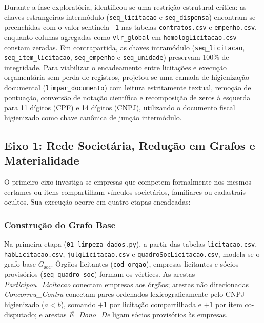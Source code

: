Durante a fase exploratória, identificou-se uma restrição estrutural crítica: as chaves estrangeiras intermódulo (\texttt{seq\_\allowbreak licitacao} e \texttt{seq\_\allowbreak dispensa}) encontram-se preenchidas com o valor sentinela \texttt{-1} nas tabelas \texttt{contratos.csv} e \texttt{empenho.csv}, enquanto colunas agregadas como \texttt{vlr\_\allowbreak global} em \texttt{homolog\allowbreak Licitacao\allowbreak .csv} constam zeradas. Em contrapartida, as chaves intramódulo (\texttt{seq\_\allowbreak licitacao}, \texttt{seq\_\allowbreak item\_\allowbreak licitacao}, \texttt{seq\_\allowbreak empenho} e \texttt{seq\_\allowbreak unidade}) preservam 100\% de integridade. Para viabilizar o encadeamento entre licitações e execução orçamentária sem perda de registros, projetou-se uma camada de higienização documental (\texttt{limpar\_\allowbreak documento}) com leitura estritamente textual, remoção de pontuação, conversão de notação científica e recomposição de zeros à esquerda para 11 dígitos (CPF) e 14 dígitos (CNPJ), utilizando o documento fiscal higienizado como chave canônica de junção intermódulo.

\subsection{Eixo 1: Rede Societária, Redução em Grafos e Materialidade}

O primeiro eixo investiga se empresas que competem formalmente nos mesmos certames ou itens compartilham vínculos societários, familiares ou cadastrais ocultos. Sua execução ocorre em quatro etapas encadeadas:

\subsubsection{Construção do Grafo Base}
Na primeira etapa (\texttt{01\_\allowbreak limpeza\_\allowbreak dados\allowbreak .py}), a partir das tabelas \texttt{licitacao\allowbreak .csv}, \texttt{hab\allowbreak Licitacao\allowbreak .csv}, \texttt{julg\allowbreak Licitacao\allowbreak .csv} e \texttt{quadro\allowbreak Soc\allowbreak Licitacao\allowbreak .csv}, modela-se o grafo base $G_{\text{soc}}$. Órgãos licitantes (\texttt{cod\_\allowbreak orgao}), empresas licitantes e sócios provisórios (\texttt{seq\_\allowbreak quadro\_\allowbreak soc}) formam os vértices. As arestas \textit{Participou\_\allowbreak Licitacao} conectam empresas aos órgãos; arestas não direcionadas \textit{Concorreu\_\allowbreak Contra} conectam pares ordenados lexicograficamente pelo CNPJ higienizado ($a < b$), somando $+1$ por licitação compartilhada e $+1$ por item co-disputado; e arestas \textit{É\_\allowbreak Dono\_\allowbreak De} ligam sócios provisórios às empresas.

